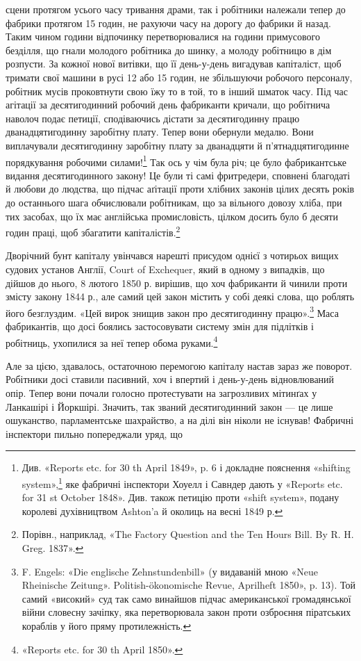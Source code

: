 сцени протягом усього часу тривання драми, так і робітники належали
тепер до фабрики протягом 15 годин, не рахуючи часу на
дорогу до фабрики й назад. Таким чином години відпочинку перетворювалися
на години примусового безділля, що гнали молодого
робітника до шинку, а молоду робітницю в дім розпусти. За
кожної нової витівки, що її день-у-день вигадував капіталіст,
щоб тримати свої машини в русі 12 або 15 годин, не збільшуючи
робочого персоналу, робітник мусів проковтнути свою їжу то в
той, то в інший шматок часу. Під час агітації за десятигодинний
робочий день фабриканти кричали, що робітнича наволоч подає
петиції, сподіваючись дістати за десятигодинну працю дванадцятигодинну
заробітну плату. Тепер вони обернули медалю. Вони
виплачували десятигодинну заробітну плату за дванадцяти й
п’ятнадцятигодинне порядкування робочими силами!\footnote{
Див. «Reports etc. for 30 th April 1849», p. 6 і докладне пояснення
«shifting system»,\footnote*{
— системи пересувань. \emph{Ред.}
} яке фабричні інспектори Хоуелл і Савндер дають
у «Reports etc. for 31 st October 1848». Див. також петицію проти
«shift system», подану королеві духівництвом Ashton’a й околиць на весні
1849 р.
} Так ось
у чім була річ; це було фабрикантське видання десятигодинного
закону! Це були ті самі фритредери, сповнені благодаті й любови
до людства, що підчас аґітації проти хлібних законів цілих десять
років до останнього шага обчислювали робітникам, що за вільного
довозу хліба, при тих засобах, що їх має англійська промисловість,
цілком досить було б десяти годин праці, щоб збагатити
капіталістів.\footnote{
Порівн., наприклад, «The Factory Question and the Ten Hours
Bill. By R. H. Greg. 1837».
}

Дворічний бунт капіталу увінчався нарешті присудом однієї
з чотирьох вищих судових установ Англії, Court of Exchequer,
який в одному з випадків, що дійшов до нього, 8 лютого 1850 р.
вирішив, що хоч фабриканти й чинили проти змісту закону
1844 р., але самий цей закон містить у собі деякі слова, що роблять
його безглуздим. «Цей вирок знищив закон про десятигодинну
працю».\footnote{
F. Engels: «Die englische Zehnstundenbill» (у видаваній мною
«Neue Rheinische Zeitung». Politish-ökonomische Revue, Aprilheft
1850», p. 13). Той самий «високий» суд так само винайшов підчас американської
громадянської війни словесну зачіпку, яка перетворювала закон
проти озброєння піратських кораблів у його пряму протилежність.
} Маса фабрикантів, що досі боялись застосовувати
систему змін для підлітків і робітниць, ухопилися за неї тепер
обома руками.\footnote{
«Reports etc. for 30 th April 1850».
}

Але за цією, здавалось, остаточною перемогою капіталу
настав зараз же поворот. Робітники досі ставили пасивний, хоч
і впертий і день-у-день відновлюваний опір. Тепер вони почали
голосно протестувати на загрозливих мітинґах у Ланкашірі і
Йоркшірі. Значить, так званий десятигодинний закон — це лише
ошуканство, парламентське шахрайство, а на ділі він ніколи не
існував! Фабричні інспектори пильно попереджали уряд, що